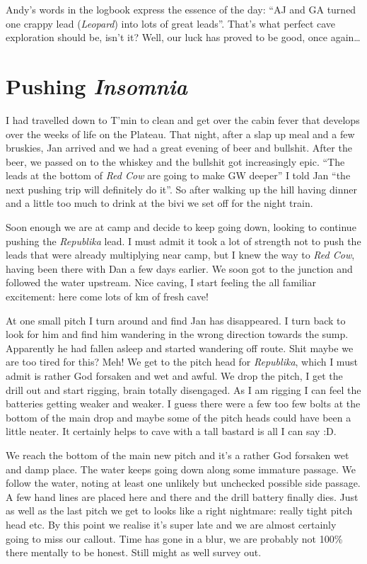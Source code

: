 Andy's words in the logbook express the essence of the day: ``AJ and GA
turned one crappy lead (\emph{Leopard}) into lots of great leads''.
That's what perfect cave exploration should be, isn't it? Well, our luck
has proved to be good, once again\ldots{}


\hypertarget{pushing-insomnia}{%
\section{\texorpdfstring{Pushing
\emph{Insomnia}}{Pushing Insomnia}}\label{pushing-insomnia}}

I had travelled down to T'min to clean and get over the cabin fever that
develops over the weeks of life on the Plateau. That night, after a slap
up meal and a few bruskies, Jan arrived and we had a great evening of
beer and bullshit. After the beer, we passed on to the whiskey and the
bullshit got increasingly epic. ``The leads at the bottom of \emph{Red
Cow} are going to make GW deeper'' I told Jan ``the next pushing trip
will definitely do it''. So after walking up the hill having dinner and
a little too much to drink at the bivi we set off for the night train.

Soon enough we are at camp and decide to keep going down, looking to
continue pushing the \emph{Republika} lead. I must admit it took a lot
of strength not to push the leads that were already multiplying near
camp, but I knew the way to \emph{Red Cow}, having been there with Dan a
few days earlier. We soon got to the junction and followed the water
upstream. Nice caving, I start feeling the all familiar excitement: here
come lots of km of fresh cave!

At one small pitch I turn around and find Jan has disappeared. I turn
back to look for him and find him wandering in the wrong direction
towards the sump. Apparently he had fallen asleep and started wandering
off route. Shit maybe we are too tired for this? Meh! We get to the
pitch head for \emph{Republika}, which I must admit is rather God
forsaken and wet and awful. We drop the pitch, I get the drill out and
start rigging, brain totally disengaged. As I am rigging I can feel the
batteries getting weaker and weaker. I guess there were a few too few
bolts at the bottom of the main drop and maybe some of the pitch heads
could have been a little neater. It certainly helps to cave with a tall
bastard is all I can say :D.

We reach the bottom of the main new pitch and it's a rather God forsaken
wet and damp place. The water keeps going down along some immature
passage. We follow the water, noting at least one unlikely but unchecked
possible side passage. A few hand lines are placed here and there and
the drill battery finally dies. Just as well as the last pitch we get to
looks like a right nightmare: really tight pitch head etc. By this point
we realise it's super late and we are almost certainly going to miss our
callout. Time has gone in a blur, we are probably not 100\% there
mentally to be honest. Still might as well survey out.

